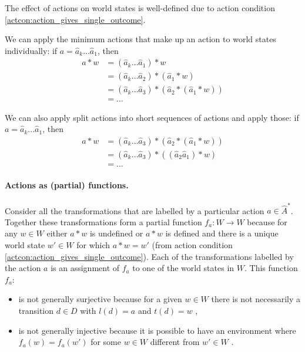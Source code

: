 The effect of actions on world states is well-defined due to action condition \ref{actcon:action_gives_single_outcome}.

We can apply the minimum actions that make up an action to world states individually:
if $a = \hat{a}_{k}...\hat{a}_{1}$, then
\begin{align*}
    a * w &= (\hat{a}_{k} \dots \hat{a}_{1}) * w \\
          &= (\hat{a}_{k} \dots \hat{a}_{2}) * (\hat{a}_{1} * w) \\
          &= (\hat{a}_{k} \dots \hat{a}_{3}) * (\hat{a}_{2} * (\hat{a}_{1} * w)) \\
          &= \dots
\end{align*}

We can also apply split actions into short sequences of actions and apply those:
if $a = \hat{a}_{k}...\hat{a}_{1}$, then
\begin{align*}
    a * w &= (\hat{a}_{k} \dots \hat{a}_{3}) * (\hat{a}_{2} * (\hat{a}_{1} * w)) \\
          &= (\hat{a}_{k} \dots \hat{a}_{3}) * ((\hat{a}_{2} \hat{a}_{1}) * w) \\
          &= \dots
\end{align*}

\paragraph{Actions as (partial) functions.}

Consider all the transformations that are labelled by a particular action $a \in \hat{A}^{*}$.
Together these transformations form a partial function $f_{a}: W \to W$ because for any $w \in W$ either $a * w$ is undefined or $a * w$ is defined and there is a unique world state $w' \in W$ for which $a * w = w'$ (from action condition \ref{actcon:action_gives_single_outcome}).
Each of the transformations labelled by the action $a$ is an assignment of $f_{a}$ to one of the world states in $W$.
This function $f_{a}$:
\begin{itemize}[-]
    \item is not generally surjective because for a given $w \in W$ there is not necessarily a transition $d \in D$ with $l(d) = a$ and $t(d) = w$ ,

    \item is not generally injective because it is possible to have an environment where $f_{a}(w)=f_{a}(w')$ for some $w \in W$ different from $w' \in W$ .
\end{itemize}


